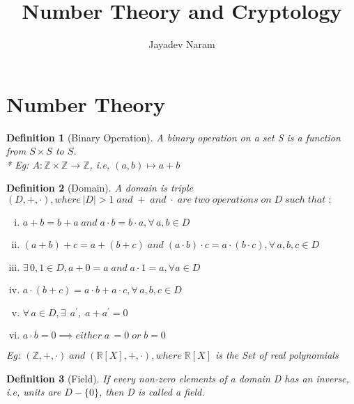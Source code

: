 \documentclass[10pt,a4paper]{article}
\author{Jayadev Naram}
\title{Number Theory and Cryptology}
\begin{document}
\maketitle 

\part{Number Theory}
  
\newtheorem{theorem}{Theorem}
\newtheorem{corollary}{Corollary}[theorem]
\newtheorem{lemma}[theorem]{Lemma}
\newtheorem{definition}{Definition}
\newtheorem*{remark}{Remark}
\newtheorem*{proposition}{Proposition}
\newcommand{\leg}[2]{\big(\frac{#1}{#2}\big)}
\newcommand{\modp}[2]{#1(mod\;#2)}
	
\begin{definition}[Binary Operation]
A binary operation on a set S is a function from $S\times{S}$ to $S$.
\\* Eg: $A:\mathbb{Z}\times{\mathbb{Z}} \to \mathbb{Z}$, i.e, $(a,b) \mapsto a+b$
\end{definition}

\begin{definition}[Domain]
A domain is triple $(D,+,\cdot), where\, \vert{D}\vert > 1 \;and\; + \;and\; \cdot \;are\; two\; operations\; on\; D\; such\; that\;{:}$
\begin{enumerate}[i)]
	\item $a+b = b+a \;and\; a\cdot{b} = b\cdot{a}, \forall\, a,b \in D$
	\item $(a+b)+c = a+(b+c) \;and\; (a\cdot{b})\cdot{c} = a\cdot(b\cdot{c}), \forall\, a,b,c \in D$
	\item $\exists\, 0,1 \in D, a+0 = a\;and\;a\cdot{1} = a, \forall a \in D$
	\item $a\cdot(b+c) = a\cdot{b} + a\cdot{c}, \forall\, a,b,c \in D$
	\item $\forall\,a\in D, \exists\,\;a^{\prime},\;a+a^{\prime} = 0$
	\item $a\cdot{b} = 0 \implies either\;a\, = 0\;or\;b= 0$
\end{enumerate}
Eg: $(\mathbb{Z},+,\cdot) \;and\; (\mathbb{R}[X],+,\cdot), where\; \mathbb{R}[X]$ is the Set of real polynomials
\end{definition}

\begin{definition}[Field]
If every non-zero elements of a domain D has an inverse, i.e, units are $D-\{0\}$, then D is called a field.
\end{definition}
\end{document}
